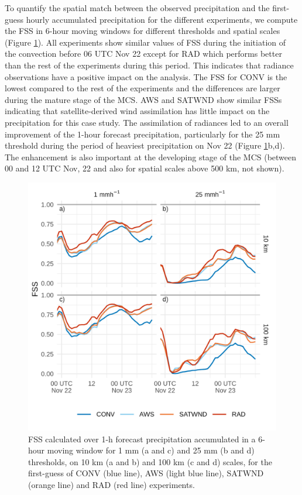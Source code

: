 \documentclass[final,5p,times,twocolumn,authoryear]{elsarticle} %
\begin{document}
To quantify the spatial match between the observed precipitation and the first-guess hourly accumulated precipitation for the different experiments, we compute the FSS in 6-hour moving windows for different thresholds and spatial scales (Figure \ref{fig:fss}). All experiments show similar values of FSS during the initiation of the convection before 06 UTC Nov 22 except for RAD which performs better than the rest of the experiments during this period. This indicates that radiance observations have a positive impact on the analysis. The FSS for CONV is the lowest compared to the rest of the experiments and the differences are larger during the mature stage of the MCS. AWS and SATWND show similar FSSs indicating that satellite-derived wind assimilation has little impact on the precipitation for this case study. The assimilation of radiances led to an overall improvement of the 1-hour forecast precipitation, particularly for the 25 mm threshold during the period of heaviest precipitation on Nov 22 (Figure \ref{fig:fss}b,d). The enhancement is also important at the developing stage of the MCS (between 00 and 12 UTC Nov, 22 and also for spatial scales above 500 km, not shown).



\begin{figure}
\centering
\includegraphics{../figures/fss-1.png}
\caption{\label{fig:fss}FSS calculated over 1-h forecast precipitation accumulated in a 6-hour moving window for 1 mm (a and c) and 25 mm (b and d) thresholds, on 10 km (a and b) and 100 km (c and d) scales, for the first-guess of CONV (blue line), AWS (light blue line), SATWND (orange line) and RAD (red line) experiments.}
\end{figure}
\end{document}
